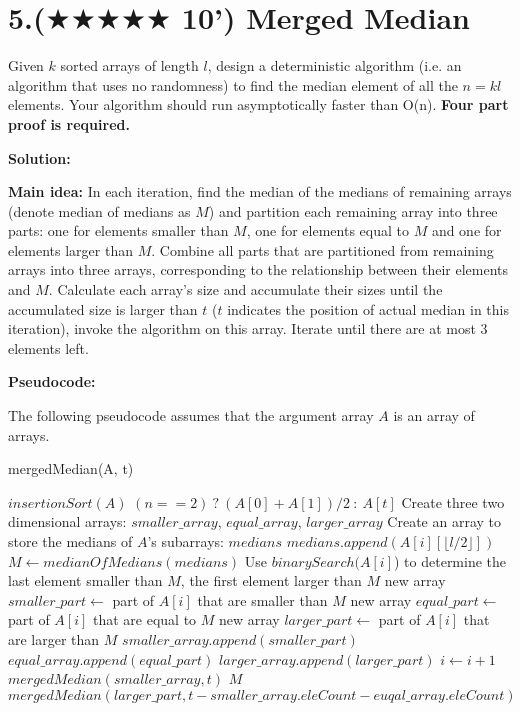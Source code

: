 \documentclass{article}
\begin{document}
\section*{5.($\bigstar\bigstar\bigstar\bigstar\bigstar$ 10') Merged Median}
Given $k$ sorted arrays of length $l$, design a deterministic algorithm (i.e. an algorithm that
uses no randomness) to find the median element of all the $n = kl$ elements. Your algorithm should run asymptotically faster than O(n). {\textbf{Four part proof is required.}}
{\color{blue}
\par\textbf{Solution: }
\par\textbf{Main idea: }In each iteration, find the median of the medians of remaining arrays (denote median of medians as $M$) and partition each remaining array into three parts: one for elements smaller than $M$, one for elements equal to $M$ and one for elements larger than $M$. Combine all parts that are partitioned from remaining arrays into three arrays, corresponding to the relationship between their elements and $M$. Calculate each array's size and accumulate their sizes until the accumulated size is larger than $t$ ($t$ indicates the position of actual median in this iteration), invoke the algorithm on this array. Iterate until there are at most 3 elements left.\\

\par\textbf{Pseudocode: }
\par The following pseudocode assumes that the argument array $A$ is an array of arrays.
\begin{algorithm}
	\caption{mergedMedian(A, t)}
	\label{alg2}
	\color{blue}
	\begin{algorithmic}
			\STATE $insertionSort(A)$
			\RETURN $(n==2)\ ?\ (A[0]+A[1])/2\ :\ A[t]$
		\ENDIF
		\STATE Create three two dimensional arrays: $smaller\_array$, $equal\_array$, $larger\_array$
		\STATE Create an array to store the medians of $A$'s subarrays: $medians$
			\STATE $medians.append(A[i][\lfloor l/2\rfloor])$
		\ENDWHILE
		\STATE $M \gets medianOfMedians(medians)$
	  	\STATE Use $binarySearch(A[i]$) to determine the last element smaller than $M$, the first element larger than $M$
		\STATE new array $smaller\_part \gets$ part of $A[i]$ that are smaller than $M$
		\STATE new array $equal\_part \gets$ part of $A[i]$ that are equal to $M$
		\STATE new array $larger\_part \gets$ part of $A[i]$ that are larger than $M$
		\STATE $smaller\_array.append(smaller\_part)$
		\STATE $equal\_array.append(equal\_part)$
		\STATE $larger\_array.append(larger\_part)$
		\STATE $i \gets i + 1$
		\ENDWHILE
			\RETURN $mergedMedian(smaller\_array, t)$
			\RETURN $M$
		\ELSE
			\RETURN $mergedMedian(larger\_part, t-smaller\_array.eleCount-euqal\_array.eleCount)$
		\ENDIF
	\end{algorithmic}
\end{algorithm}

}
\end{document}
